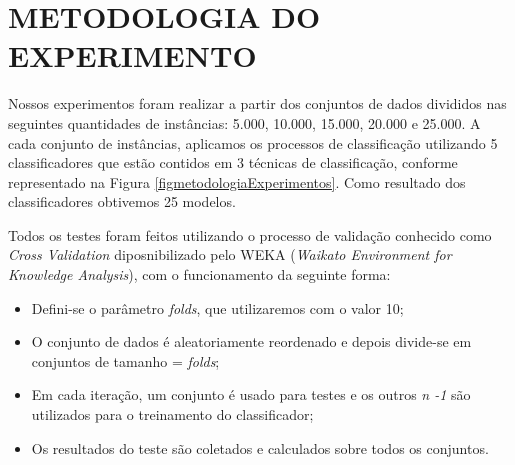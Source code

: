 \documentclass[
	12pt,				%
	openright,			%
	oneside,	
	a4paper,				%
	english,				%
	brazil				%
]{abntex2/abntex2} %
\begin{document}
\begin{itemize}
\begin{figure}[!h]
\begin{center}
				\end{center}
			\end{figure}
		\end{itemize}

		
	\section{METODOLOGIA DO EXPERIMENTO}
	
	Nossos experimentos foram realizar a partir dos conjuntos de dados divididos nas seguintes quantidades de instâncias: 5.000, 10.000, 15.000, 20.000 e 25.000. A cada conjunto de instâncias, aplicamos os processos de classificação utilizando 5 classificadores que estão contidos em 3 técnicas de classificação, conforme representado na Figura \ref{figmetodologiaExperimentos}. Como resultado dos classificadores obtivemos 25 modelos. 
	
	Todos os testes foram feitos utilizando o processo de validação conhecido como \textit{Cross Validation} diposnibilizado pelo WEKA (\textit{Waikato Environment for Knowledge Analysis}), com o funcionamento da seguinte forma:
	\begin{itemize}
		\item Defini-se o parâmetro \textit{folds}, que utilizaremos com o valor 10;
		\item O conjunto de dados é aleatoriamente reordenado e depois divide-se em conjuntos de tamanho = \textit{folds};
		\item Em cada iteração, um conjunto é usado para testes e os outros \textit{n -1} são utilizados para o treinamento do classificador;
		\item Os resultados do teste são coletados e calculados sobre todos os conjuntos.
	\end{itemize}
	 
\end{document}
